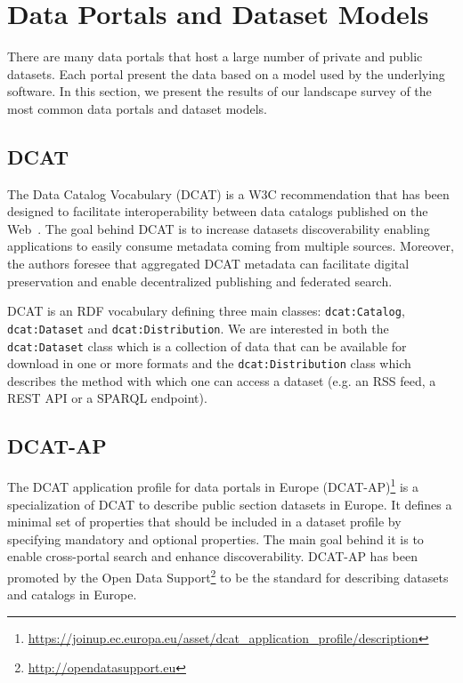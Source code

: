 
\section{Data Portals and Dataset Models}
\label{section:datasetModels}
There are many data portals that host a large number of private and public datasets. Each portal present the data based on a model used by the underlying software. In this section, we present the results of our landscape survey of the most common data portals and dataset models.

\subsection{DCAT}
The Data Catalog Vocabulary (DCAT) is a W3C recommendation that has been designed to facilitate interoperability between data catalogs published on the Web~\cite{Erickson:DCV:14}. The goal behind DCAT is to increase datasets discoverability enabling applications to easily consume metadata coming from multiple sources. Moreover, the authors foresee that aggregated DCAT metadata can facilitate digital preservation and enable decentralized publishing and federated search.

DCAT is an RDF vocabulary defining three main classes: \texttt{dcat:Catalog}, \texttt{dcat:Dataset} and \texttt{dcat:Distribution}. We are interested in both the \texttt{dcat:Dataset} class which is a collection of data that can be available for download in one or more formats and the \texttt{dcat:Distribution} class which describes the method with which one can access a dataset (e.g. an RSS feed, a REST API or a SPARQL endpoint).

\subsection{DCAT-AP}
The DCAT application profile for data portals in Europe (DCAT-AP)\footnote{\url{https://joinup.ec.europa.eu/asset/dcat\_application\_profile/description}} is a specialization of DCAT to describe public section datasets in Europe. It defines a minimal set of properties that should be included in a dataset profile by specifying mandatory and optional properties. The main goal behind it is to enable cross-portal search and enhance discoverability. DCAT-AP has been promoted by the Open Data Support\footnote{\url{http://opendatasupport.eu}} to be the standard for describing datasets and catalogs in Europe.

